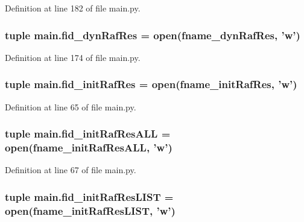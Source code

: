 Definition at line 182 of file main.\-py.

\hypertarget{a00111_aaff6b4fb4c2e2089c2a207a12f1757e3}{
\subsubsection[{fid\-\_\-dyn\-Raf\-Res}]{\setlength{\rightskip}{0pt plus 5cm}tuple main.\-fid\-\_\-dyn\-Raf\-Res = open({\bf fname\-\_\-dyn\-Raf\-Res}, 'w')}}\label{a00111_aaff6b4fb4c2e2089c2a207a12f1757e3}


Definition at line 174 of file main.\-py.

\hypertarget{a00111_a98d514a663f6bedde329d0bbbd2b78fa}{
\subsubsection[{fid\-\_\-init\-Raf\-Res}]{\setlength{\rightskip}{0pt plus 5cm}tuple main.\-fid\-\_\-init\-Raf\-Res = open({\bf fname\-\_\-init\-Raf\-Res}, 'w')}}\label{a00111_a98d514a663f6bedde329d0bbbd2b78fa}


Definition at line 65 of file main.\-py.

\hypertarget{a00111_a45aeb03f0d9cc30cb0a490354fd76d6c}{
\subsubsection[{fid\-\_\-init\-Raf\-Res\-A\-L\-L}]{\setlength{\rightskip}{0pt plus 5cm}tuple main.\-fid\-\_\-init\-Raf\-Res\-A\-L\-L = open({\bf fname\-\_\-init\-Raf\-Res\-A\-L\-L}, 'w')}}\label{a00111_a45aeb03f0d9cc30cb0a490354fd76d6c}


Definition at line 67 of file main.\-py.

\hypertarget{a00111_ae24c607a37f0f3f23d7e87f6bb4fe45b}{
\subsubsection[{fid\-\_\-init\-Raf\-Res\-L\-I\-S\-T}]{\setlength{\rightskip}{0pt plus 5cm}tuple main.\-fid\-\_\-init\-Raf\-Res\-L\-I\-S\-T = open({\bf fname\-\_\-init\-Raf\-Res\-L\-I\-S\-T}, 'w')}}\label{a00111_ae24c607a37f0f3f23d7e87f6bb4fe45b}


